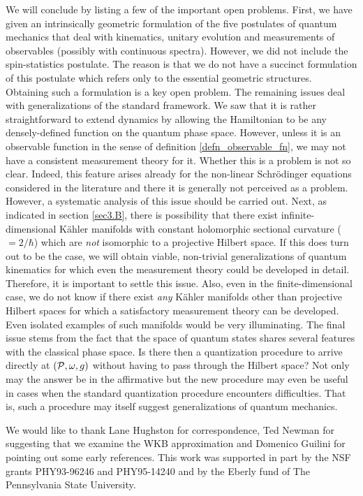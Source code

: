 We will conclude by listing a few of the important open problems.
First, we have given an intrinsically geometric formulation of the
five postulates of quantum mechanics that deal with kinematics,
unitary evolution and measurements of observables (possibly with
continuous spectra). However, we did not include the spin-statistics
postulate. The reason is that we do not have a succinct formulation of
this postulate which refers only to the essential geometric
structures. Obtaining such a formulation is a key open problem. The
remaining issues deal with generalizations of the standard
framework. We saw that it is rather straightforward to extend dynamics
by allowing the Hamiltonian to be any densely-defined function on the
quantum phase space. However, unless it is an observable function in
the sense of definition \ref{defn_observable_fn}, we may not have a
consistent measurement theory for it.  Whether this is a problem is
not so clear. Indeed, this feature arises already for the non-linear
Schr\"odinger equations considered in the literature and there it is
generally not perceived as a problem.  However, a systematic analysis
of this issue should be carried out. Next, as indicated in section
\ref{sec3.B}, there is possibility that there exist
infinite-dimensional K\"ahler manifolds with constant holomorphic
sectional curvature ($=2/\hbar$) which are {\it not} isomorphic to a
projective Hilbert space. If this does turn out to be the case, we
will obtain viable, non-trivial generalizations of quantum kinematics
for which even the measurement theory could be developed in
detail. Therefore, it is important to settle this issue. Also, even in
the finite-dimensional case, we do not know if there exist {\it any}
K\"ahler manifolds other than projective Hilbert spaces for which a
satisfactory measurement theory can be developed.  Even isolated
examples of such manifolds would be very illuminating. The final issue
stems from the fact that the space of quantum states shares several
features with the classical phase space. Is there then a quantization
procedure to arrive directly at $({\cal P}, \omega, g)$ without having to pass
through the Hilbert space? Not only may the answer be in the
affirmative but the new procedure may even be useful in cases when the
standard quantization procedure encounters difficulties. That is, such
a procedure may itself suggest generalizations of quantum mechanics.


\acknowledgements
\vskip20pt
We would like to thank Lane Hughston for correspondence, Ted Newman
for suggesting that we examine the WKB approximation and Domenico
Guilini for pointing out some early references.  This work was
supported in part by the NSF grants PHY93-96246 and PHY95-14240 and by
the Eberly fund of The Pennsylvania State University.


